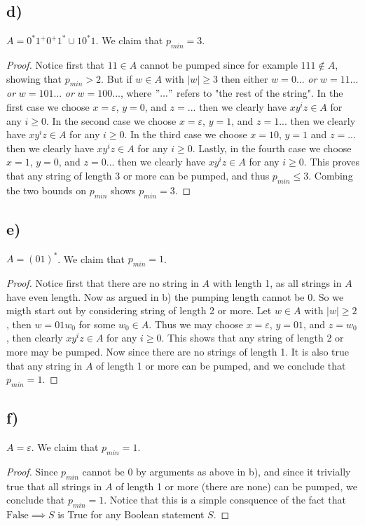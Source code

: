 \documentclass[a4paper,11pt]{article}
\newcommand{\abs}[1]{\left\lvert #1 \right\rvert}
\numberwithin{equation}{section}
\begin{document}
\subsection*{d)}
$A=0^\ast1^+0^+1^\ast\cup 10^\ast1$.
We claim that $p_{min}=3$.
\begin{proof}
Notice first that $11\in A$ cannot be pumped since for example $111\notin A$, showing that $p_{min}>2$. But if $w\in A$ with $\abs{w}\geq3$ then either $w=0...$ \emph{or} $w=11...$  \emph{or} $w=101...$ \emph{or} $w=100...$, where $"..."$ refers to "the rest of the string". In the first case we choose $x=\varepsilon$, $y=0$, and $z=...$ then we clearly have $xy^iz\in A$ for any $i\geq0$. In the second case we choose $x=\varepsilon$, $y=1$, and $z=1...$ then we clearly have $xy^iz\in A$ for any $i\geq0$. In the third case we choose $x=10$, $y=1$ and $z=...$ then we clearly have $xy^iz\in A$ for any $i\geq0$. Lastly, in the fourth case we choose $x=1$, $y=0$, and $z=0...$ then we clearly have $xy^iz\in A$ for any $i\geq0$. This proves that any string of length $3$ or more can be pumped, and thus $p_{min}\leq 3$. Combing the two bounds on $p_{min}$ shows $p_{min}=3$.
\end{proof}
\subsection*{e)}
$A=(01)^*$.
We claim that $p_{min}=1$.
\begin{proof}
Notice first that there are no string in $A$ with length 1, as all strings in $A$ have even length. Now as argued in b) the pumping length cannot be 0. So we migth start out by considering string of length 2 or more. Let $w\in A$ with $\abs{w}\geq2$, then $w=01w_0$ for some $w_0\in A$. Thus we may choose $x=\varepsilon$, $y=01$, and $z=w_0$, then clearly $xy^iz\in A$ for any $i\geq0$. This shows that any string of length 2 or more may be pumped. Now since there are no strings of length 1. It is also true that any string in $A$ of length 1 or more can be pumped, and we conclude that $p_{min}=1$.
\end{proof}
\subsection*{f)}
$A=\varepsilon$. We claim that $p_{min}=1$.
\begin{proof}
Since $p_{min}$ cannot be 0 by arguments as above in b), and since it trivially true that all strings in $A$ of length 1 or more (there are none) can be pumped, we conclude that $p_{min}=1$. Notice that this is a simple consquence of the fact that $\text{False}\implies S$ is True for any Boolean statement $S$. 
\end{proof}
\end{document}
